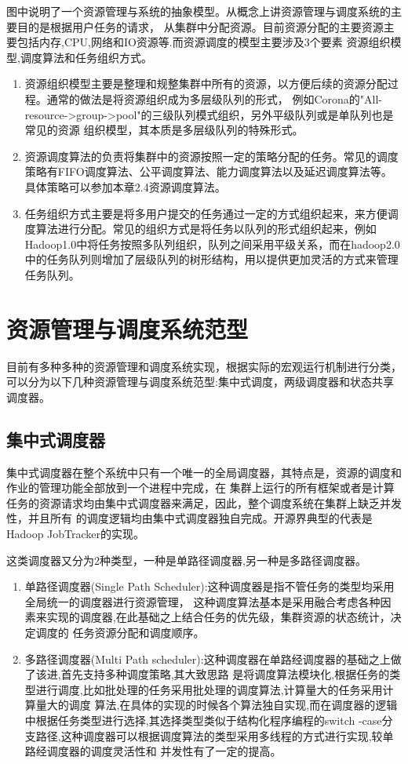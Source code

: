 图中说明了一个资源管理与系统的抽象模型。从概念上讲资源管理与调度系统的主要目的是根据用户任务的请求，
从集群中分配资源。目前资源分配的主要资源主要包括内存,CPU,网络和IO资源等.而资源调度的模型主要涉及3个要素
资源组织模型,调度算法和任务组织方式。
\begin{enumerate}
\item 资源组织模型主要是整理和规整集群中所有的资源，以方便后续的资源分配过程。通常的做法是将资源组织成为多层级队列的形式，
例如Corona的"All-resource->group->pool"的三级队列模式组织，另外平级队列或是单队列也是常见的资源
组织模型，其本质是多层级队列的特殊形式。
\item 资源调度算法的负责将集群中的资源按照一定的策略分配的任务。常见的调度策略有FIFO调度算法、公平调度算法、能力调度算法以及延迟调度算法等。具体策略可以参加本章2.4资源调度算法。
\item 任务组织方式主要是将多用户提交的任务通过一定的方式组织起来，来方便调度算法进行分配。常见的组织方式是将任务以队列的形式组织起来，例如Hadoop1.0中将任务按照多队列组织，队列之间采用平级关系，而在hadoop2.0中的任务队列则增加了层级队列的树形结构，用以提供更加灵活的方式来管理任务队列。
\end{enumerate}
\section{资源管理与调度系统范型}
目前有多种多种的资源管理和调度系统实现，根据实际的宏观运行机制进行分类，可以分为以下几种资源管理与调度系统范型:集中式调度，两级调度器和状态共享调度器。

\subsection{集中式调度器}
集中式调度器在整个系统中只有一个唯一的全局调度器，其特点是，资源的调度和作业的管理功能全部放到一个进程中完成，在
集群上运行的所有框架或者是计算任务的资源请求均由集中式调度器来满足，因此，整个调度系统在集群上缺乏并发性，并且所有
的调度逻辑均由集中式调度器独自完成。开源界典型的代表是Hadoop JobTracker的实现。

这类调度器又分为2种类型，一种是单路径调度器,另一种是多路径调度器。
\begin{enumerate}
\item 单路径调度器(Single Path Scheduler):这种调度器是指不管任务的类型均采用全局统一的调度器进行资源管理，
这种调度算法基本是采用融合考虑各种因素来实现的调度器,在此基础之上结合任务的优先级，集群资源的状态统计，决定调度的
任务资源分配和调度顺序。
\item 多路径调度器(Multi Path scheduler):这种调度器在单路经调度器的基础之上做了该进,首先支持多种调度策略,其大致思路
是将调度算法模块化,根据任务的类型进行调度,比如批处理的任务采用批处理的调度算法,计算量大的任务采用计算量大的调度
算法,在具体的实现的时候各个算法独自实现,而在调度器的逻辑中根据任务类型进行选择,其选择类型类似于结构化程序编程的switch
-case分支路径,这种调度器可以根据调度算法的类型采用多线程的方式进行实现,较单路经调度器的调度灵活性和
并发性有了一定的提高。
\end{enumerate}


